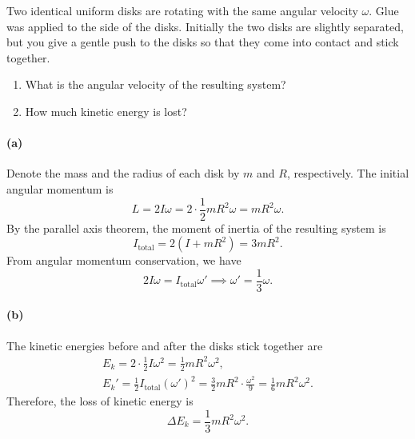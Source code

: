 \documentclass{article}
\begin{document}
\begin{problem}
Two identical uniform disks are rotating with the same angular velocity $\omega$. Glue was applied to the side of the disks. Initially the two disks are slightly separated, but you give a gentle push to the disks so that they come into contact and stick together.
\begin{enumerate}
  \item[(a)] What is the angular velocity of the resulting system?
  \item[(b)] How much kinetic energy is lost?
\end{enumerate}
\begin{center}
  
\end{center}
\end{problem}

\begin{solution}
	\paragraph{(a)} Denote the mass and the radius of each disk by $m$ and $R$, respectively. The initial angular momentum is
	\[ L = 2I\omega = 2 \cdot \frac{1}{2}mR^2\omega = mR^2\omega. \]
	By the parallel axis theorem, the moment of inertia of the resulting system is
	\[ I_{\mathrm{total}} = 2(I + mR^2) = 3mR^2. \]
	From angular momentum conservation, we have
	\[ 2I\omega = I_{\mathrm{total}}\omega' \implies \omega' = \frac{1}{3}\omega. \]

	\paragraph{(b)} The kinetic energies before and after the disks stick together are
	\begin{gather*}
		E_k = 2 \cdot \frac{1}{2}I\omega^2 = \frac{1}{2}mR^2\omega^2, \\
		E_k' = \frac{1}{2}I_{\mathrm{total}}(\omega')^2
		= \frac{3}{2}mR^2 \cdot \frac{\omega^2}{9}
		= \frac{1}{6}mR^2\omega^2.
	\end{gather*}
	Therefore, the loss of kinetic energy is
	\[ \Delta E_k = \frac{1}{3}mR^2\omega^2. \]
\end{solution}
\end{document}
